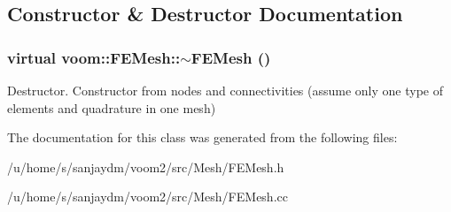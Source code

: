 \subsection{Constructor \& Destructor Documentation}
\hypertarget{classvoom_1_1_f_e_mesh_aca0b20d3ed91ee94eb8cd479de75ca05}{
\subsubsection[{$\sim$FEMesh}]{\setlength{\rightskip}{0pt plus 5cm}virtual voom::FEMesh::$\sim$FEMesh ()}}
\label{classvoom_1_1_f_e_mesh_aca0b20d3ed91ee94eb8cd479de75ca05}


Destructor. Constructor from nodes and connectivities (assume only one type of elements and quadrature in one mesh) 

The documentation for this class was generated from the following files:\begin{DoxyCompactItemize}
\item 
/u/home/s/sanjaydm/voom2/src/Mesh/FEMesh.h\item 
/u/home/s/sanjaydm/voom2/src/Mesh/FEMesh.cc\end{DoxyCompactItemize}
